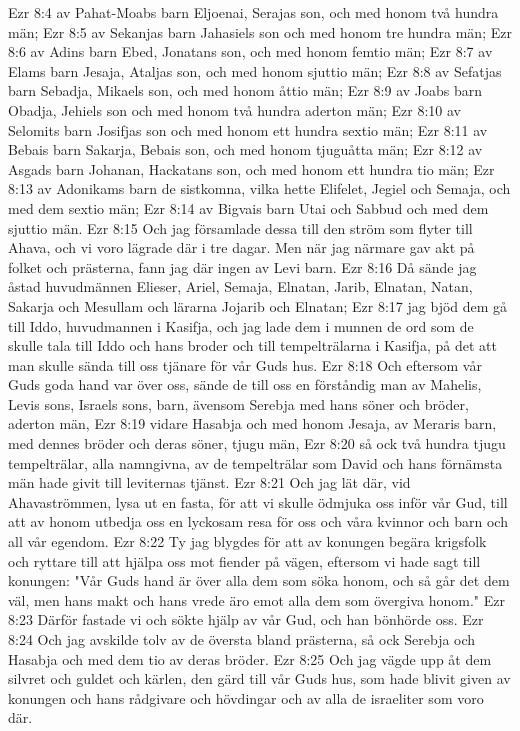 Ezr 8:4  av Pahat-Moabs barn Eljoenai, Serajas son, och med honom två hundra män;
Ezr 8:5  av Sekanjas barn Jahasiels son och med honom tre hundra män;
Ezr 8:6  av Adins barn Ebed, Jonatans son, och med honom femtio män;
Ezr 8:7  av Elams barn Jesaja, Ataljas son, och med honom sjuttio män;
Ezr 8:8  av Sefatjas barn Sebadja, Mikaels son, och med honom åttio män;
Ezr 8:9  av Joabs barn Obadja, Jehiels son och med honom två hundra aderton män;
Ezr 8:10  av Selomits barn Josifjas son och med honom ett hundra sextio män;
Ezr 8:11  av Bebais barn Sakarja, Bebais son, och med honom tjuguåtta män;
Ezr 8:12  av Asgads barn Johanan, Hackatans son, och med honom ett hundra tio män;
Ezr 8:13  av Adonikams barn de sistkomna, vilka hette Elifelet, Jegiel och Semaja, och med dem sextio män;
Ezr 8:14  av Bigvais barn Utai och Sabbud och med dem sjuttio män.
Ezr 8:15  Och jag församlade dessa till den ström som flyter till Ahava, och vi voro lägrade där i tre dagar. Men när jag närmare gav akt på folket och prästerna, fann jag där ingen av Levi barn.
Ezr 8:16  Då sände jag åstad huvudmännen Elieser, Ariel, Semaja, Elnatan, Jarib, Elnatan, Natan, Sakarja och Mesullam och lärarna Jojarib och Elnatan;
Ezr 8:17  jag bjöd dem gå till Iddo, huvudmannen i Kasifja, och jag lade dem i munnen de ord som de skulle tala till Iddo och hans broder och till tempelträlarna i Kasifja, på det att man skulle sända till oss tjänare för vår Guds hus.
Ezr 8:18  Och eftersom vår Guds goda hand var över oss, sände de till oss en förståndig man av Mahelis, Levis sons, Israels sons, barn, ävensom Serebja med hans söner och bröder, aderton män,
Ezr 8:19  vidare Hasabja och med honom Jesaja, av Meraris barn, med dennes bröder och deras söner, tjugu män,
Ezr 8:20  så ock två hundra tjugu tempelträlar, alla namngivna, av de tempelträlar som David och hans förnämsta män hade givit till leviternas tjänst.
Ezr 8:21  Och jag lät där, vid Ahavaströmmen, lysa ut en fasta, för att vi skulle ödmjuka oss inför vår Gud, till att av honom utbedja oss en lyckosam resa för oss och våra kvinnor och barn och all vår egendom.
Ezr 8:22  Ty jag blygdes för att av konungen begära krigsfolk och ryttare till att hjälpa oss mot fiender på vägen, eftersom vi hade sagt till konungen: "Vår Guds hand är över alla dem som söka honom, och så går det dem väl, men hans makt och hans vrede äro emot alla dem som övergiva honom."
Ezr 8:23  Därför fastade vi och sökte hjälp av vår Gud, och han bönhörde oss.
Ezr 8:24  Och jag avskilde tolv av de översta bland prästerna, så ock Serebja och Hasabja och med dem tio av deras bröder.
Ezr 8:25  Och jag vägde upp åt dem silvret och guldet och kärlen, den gärd till vår Guds hus, som hade blivit given av konungen och hans rådgivare och hövdingar och av alla de israeliter som voro där.

